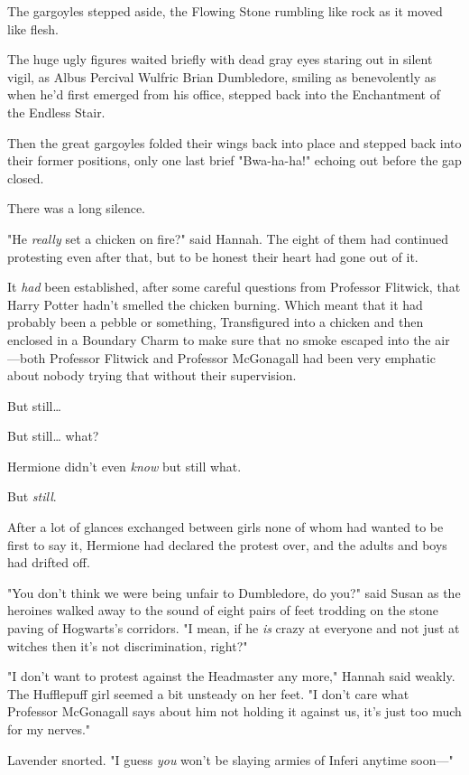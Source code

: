 The gargoyles stepped aside, the Flowing Stone rumbling like rock as it moved 
like flesh.

The huge ugly figures waited briefly with dead gray eyes staring out in silent 
vigil, as Albus Percival Wulfric Brian Dumbledore, smiling as benevolently as 
when he'd first emerged from his office, stepped back into the Enchantment of 
the Endless Stair.

Then the great gargoyles folded their wings back into place and stepped back 
into their former positions, only one last brief "Bwa-ha-ha!" echoing out 
before the gap closed.

There was a long silence.

"He \emph{really} set a chicken on fire?" said Hannah.
\sbreak
The eight of them had continued protesting even after that, but to be honest 
their heart had gone out of it.

It \emph{had} been established, after some careful questions from Professor 
Flitwick, that Harry Potter hadn't smelled the chicken burning. Which meant 
that it had probably been a pebble or something, Transfigured into a chicken 
and then enclosed in a Boundary Charm to make sure that no smoke escaped into 
the air---both Professor Flitwick and Professor McGonagall had been very 
emphatic about nobody trying that without their supervision.

But still{\ldots}

But still{\ldots} what?

Hermione didn't even \emph{know} but still what.

But \emph{still}.

After a lot of glances exchanged between girls none of whom had wanted to be 
first to say it, Hermione had declared the protest over, and the adults and 
boys had drifted off.

"You don't think we were being unfair to Dumbledore, do you?" said Susan as the 
heroines walked away to the sound of eight pairs of feet trodding on the stone 
paving of Hogwarts's corridors. "I mean, if he \emph{is} crazy at everyone and 
not just at witches then it's not discrimination, right?"

"I don't want to protest against the Headmaster any more," Hannah said weakly. 
The Hufflepuff girl seemed a bit unsteady on her feet. "I don't care what 
Professor McGonagall says about him not holding it against us, it's just too 
much for my nerves."

Lavender snorted. "I guess \emph{you} won't be slaying armies of Inferi anytime 
soon---"

